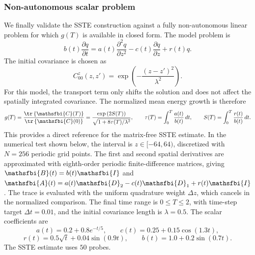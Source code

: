 \begin{appendices}
\subsubsection{Non-autonomous scalar problem}
\label{sec:appendix_verification_nonautonomous}
We finally validate the SSTE construction against a fully non-autonomous linear problem for which \(g(T)\) is available in closed form. The model problem is
\begin{equation}
  b(t)\frac{\partial q}{\partial t}
  =
  a(t)\frac{\partial^2 q}{\partial z^2}
  -
  c(t)\frac{\partial q}{\partial z}
  +
  r(t)q .
\end{equation}
The initial covariance is chosen as
\begin{equation}
  C_{00}^{z}(z,z')
  =
  \exp\left(
    -\frac{(z-z')^2}{\lambda^2}
  \right).
\end{equation}
For this model, the transport term only shifts the solution and does not affect the spatially integrated covariance. The normalized mean energy growth is therefore
\begin{equation}
  g(T)
  =
  \frac{\tr\left\{\mathsfbi{C}(T)\right\}}{\tr\left\{\mathsfbi{C}(0)\right\}}
  =
  \frac{
    \exp\left(2S(T)\right)
  }{
    \sqrt{1+8\tau(T)/\lambda^2}
  },
  \qquad
  \tau(T)=\int_0^T \frac{a(t)}{b(t)}\,dt,
  \qquad
  S(T)=\int_0^T \frac{r(t)}{b(t)}\,dt .
\end{equation}
This provides a direct reference for the matrix-free SSTE estimate. In the numerical test shown below, the interval is \(z\in[-64,64)\), discretized with \(N=256\) periodic grid points. The first and second spatial derivatives are approximated with eighth-order periodic finite-difference matrices, giving \(\mathsfbi{B}(t)=b(t)\mathsfbi{I}\) and \(\mathsfbi{A}(t)=a(t)\mathsfbi{D}_2-c(t)\mathsfbi{D}_1+r(t)\mathsfbi{I}\). The trace is evaluated with the uniform quadrature weight \(\Delta z\), which cancels in the normalized comparison. The final time range is \(0\le T\le 2\), with time-step target \(\Delta t=0.01\), and the initial covariance length is \(\lambda=0.5\). The scalar coefficients are
\begin{equation}
  a(t)=0.2+0.8e^{-t/5},\qquad
  c(t)=0.25+0.15\cos(1.3t),
\end{equation}
\begin{equation}
  r(t)=0.5\sqrt{t}+0.04\sin(0.9t),\qquad
  b(t)=1.0+0.2\sin(0.7t).
\end{equation}
The SSTE estimate uses \(50\) probes.


\end{appendices}
